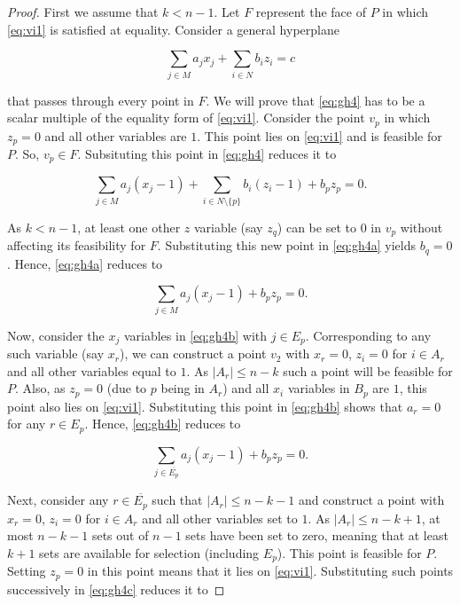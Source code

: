 \documentclass[12pt]{article}
\renewcommand{\v}[1]{\overline{#1}}
\begin{document}
\begin{proof}
First we assume that $k<n-1$. Let $F$ represent the face of $P$ in which \eqref{eq:vi1} is satisfied at equality. Consider a general hyperplane

\begin{equation} \label{eq:gh4}
\sum_{j \in M} a_j x_j + \sum_{i \in N} b_i z_i = c
\end{equation}

that passes through every point in $F$. We will prove that \eqref{eq:gh4} has to be a scalar multiple of the equality form of \eqref{eq:vi1}. Consider the point $v_p$ in which $z_p = 0$ and all other variables are $1$. This point lies on \eqref{eq:vi1} and is feasible for $P$. So, $v_p \in F$. Subsituting this point in \eqref{eq:gh4} reduces it to

\begin{equation} \label{eq:gh4a}
\sum_{j \in M} a_j (x_j - 1) + \sum_{i \in N \setminus \{p\}} b_i (z_i - 1) + b_p z_p = 0.
\end{equation}

As $k<n-1$, at least one other $z$ variable (say $z_q$) can be set to $0$ in $v_p$ without affecting its feasibility for $F$. Substituting this new point in \eqref{eq:gh4a} yields $b_q = 0$. Hence, \eqref{eq:gh4a} reduces to

\begin{equation} \label{eq:gh4b}
\sum_{j \in M} a_j (x_j - 1) + b_p z_p = 0.
\end{equation}

Now, consider the $x_j$ variables in \eqref{eq:gh4b} with $j \in E_p$. Corresponding to any such variable (say $x_r$), we can construct a point $v_2$ with $x_r = 0$, $z_i = 0$ for $i \in A_r$ and all other variables equal to $1$. As $|A_r| \leq n-k$ such a point will be feasible for $P$. Also, as $z_p=0$ (due to $p$ being in $A_r$) and all $x_i$ variables in $B_p$ are $1$, this point also lies on \eqref{eq:vi1}. Substituting this point in \eqref{eq:gh4b} shows that $a_r=0$ for any $r \in E_p$. Hence, \eqref{eq:gh4b} reduces to

\begin{equation} \label{eq:gh4c}
\sum_{j \in \v{E_p}} a_j (x_j - 1) + b_p z_p = 0.
\end{equation}

Next, consider any $r \in \v{E_p}$ such that $|A_r| \leq n-k-1$ and construct a point with $x_r = 0$, $z_i = 0$ for $i \in A_r$ and all other variables set to $1$. As $|A_r| \leq n-k+1$, at most $n-k-1$ sets out of $n-1$ sets have been set to zero, meaning that
at least $k+1$ sets are available for selection (including $E_p$). This point is feasible for $P$. Setting $z_p = 0$ in this point means that it lies on \eqref{eq:vi1}. Substituting such points successively in \eqref{eq:gh4c} reduces it to


\end{proof}
\end{document}
